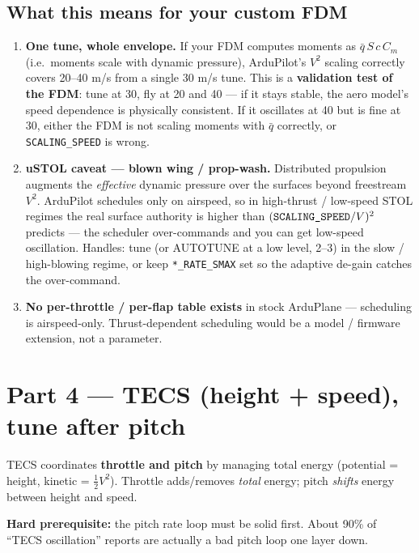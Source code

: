 \documentclass[11pt,a4paper]{article}
\newcommand{\pp}[1]{\texttt{#1}} %
\begin{document}
\subsection{What this means for your custom FDM}
\begin{enumerate}[leftmargin=1.6em]
  \item \textbf{One tune, whole envelope.} If your FDM computes moments as
  $\bar q\, S\, c\, C_m$ (i.e.\ moments scale with dynamic pressure), ArduPilot's
  $V^2$ scaling correctly covers 20--40 m/s from a single 30 m/s tune. This is a
  \textbf{validation test of the FDM}: tune at 30, fly at 20 and 40 --- if it
  stays stable, the aero model's speed dependence is physically consistent. If it
  oscillates at 40 but is fine at 30, either the FDM is not scaling moments with
  $\bar q$ correctly, or \pp{SCALING\_SPEED} is wrong.
  \item \textbf{uSTOL caveat --- blown wing / prop-wash.} Distributed propulsion
  augments the \emph{effective} dynamic pressure over the surfaces beyond
  freestream $V^2$. ArduPilot schedules only on airspeed, so in high-thrust /
  low-speed STOL regimes the real surface authority is higher than
  $(\text{\pp{SCALING\_SPEED}}/V)^2$ predicts --- the scheduler over-commands and
  you can get low-speed oscillation. Handles: tune (or AUTOTUNE at a low level,
  2--3) in the slow / high-blowing regime, or keep \pp{*\_RATE\_SMAX} set so the
  adaptive de-gain catches the over-command.
  \item \textbf{No per-throttle / per-flap table exists} in stock ArduPlane ---
  scheduling is airspeed-only. Thrust-dependent scheduling would be a model /
  firmware extension, not a parameter.
\end{enumerate}

\section{Part 4 --- TECS (height + speed), tune after pitch}

TECS coordinates \textbf{throttle and pitch} by managing total energy (potential
= height, kinetic = $\tfrac12 V^2$). Throttle adds/removes \emph{total} energy;
pitch \emph{shifts} energy between height and speed.

\textbf{Hard prerequisite:} the pitch rate loop must be solid first. About 90\% of
``TECS oscillation'' reports are actually a bad pitch loop one layer down.
\end{document}
